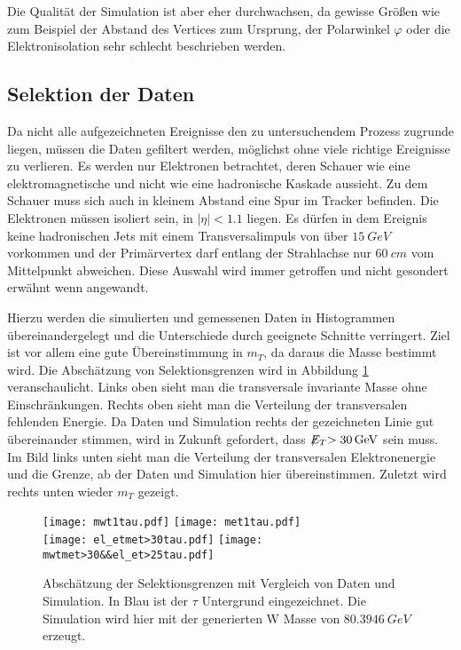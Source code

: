 \documentclass[a4paper,12pt]{article}
\newcommand{\met}{\ensuremath{\not\mathrel{E}}_T}
\begin{document}
Die Qualität der Simulation ist aber eher durchwachsen, da gewisse Größen wie zum Beispiel der
Abstand des Vertices zum Ursprung, der Polarwinkel $φ$ oder die Elektronisolation sehr schlecht
beschrieben werden.

\subsection{Selektion der Daten}
Da nicht alle aufgezeichneten Ereignisse den zu untersuchendem Prozess zugrunde liegen, müssen die
Daten gefiltert werden, möglichst ohne viele richtige Ereignisse zu verlieren. Es werden nur
Elektronen betrachtet, deren Schauer wie eine elektromagnetische und nicht wie eine hadronische
Kaskade aussieht. Zu dem Schauer muss sich auch in kleinem Abstand eine Spur im Tracker befinden.
Die Elektronen müssen isoliert sein, in $|\eta| < 1.1$ liegen. Es dürfen in dem Ereignis keine
hadronischen Jets mit einem Transversalimpuls von über $\SI{15}{GeV}$ vorkommen und der Primärvertex
darf entlang der Strahlachse nur $\SI{60}{cm}$ vom Mittelpunkt abweichen. Diese Auswahl wird immer
getroffen und nicht gesondert erwähnt wenn angewandt.

Hierzu werden die simulierten und gemessenen Daten in Histogrammen übereinandergelegt
und die Unterschiede durch geeignete Schnitte verringert. Ziel ist vor allem eine gute
Übereinstimmung in $m_T$, da daraus die Masse bestimmt wird. Die Abschätzung von Selektionsgrenzen
wird in Abbildung \ref{fig:abschaetzung} veranschaulicht. Links oben sieht man die transversale
invariante Masse ohne Einschränkungen. Rechts oben sieht man die Verteilung der transversalen
fehlenden Energie. Da Daten und Simulation rechts der gezeichneten Linie gut übereinander stimmen,
wird in Zukunft gefordert, dass $\met > \SI{30}{GeV}$ sein muss. Im Bild links unten sieht man die
Verteilung der transversalen Elektronenergie und die Grenze, ab der Daten und Simulation hier
übereinstimmen. Zuletzt wird rechts unten wieder $m_T$ gezeigt.

\begin{figure}[htb]
	\centering
	\texttt{[image: mwt1tau.pdf]}
	\texttt{[image: met1tau.pdf]}\\
	\texttt{[image: el\_etmet>30tau.pdf]}
	\texttt{[image: mwtmet>30\&\&el\_et>25tau.pdf]}
	\caption{Abschätzung der Selektionsgrenzen mit Vergleich von Daten und Simulation. In Blau ist
	der $τ$ Untergrund eingezeichnet. Die Simulation wird hier mit der generierten W Masse von
	$\SI{80.3946}{GeV}$ erzeugt.}
	\label{fig:abschaetzung}
\end{figure}
\end{document}
